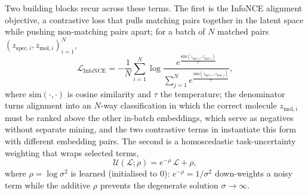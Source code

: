 Two building blocks recur across these terms.
The first is the InfoNCE alignment objective, a contrastive loss that pulls matching pairs together in the latent space while pushing non-matching pairs apart; for a batch of $N$ matched pairs $(z_{\mathrm{spec},i}, z_{\mathrm{mol},i})_{i=1}^{N}$,
\begin{equation}
    \label{eq:infonce}
    \mathcal{L}_{\mathrm{InfoNCE}} = -\frac{1}{N}\sum_{i=1}^{N} \log \frac{e^{\frac{\mathrm{sim}(z_{\mathrm{spec},i}, z_{\mathrm{mol},i})}{\tau}}}{\sum_{j=1}^{N} e^{\frac{\mathrm{sim}(z_{\mathrm{spec},i}, z_{\mathrm{mol},j})}{\tau}}},
\end{equation}
where $\mathrm{sim}(\cdot,\cdot)$ is cosine similarity and $\tau$ the temperature; the denominator turns alignment into an $N$-way classification in which the correct molecule $z_{\mathrm{mol},i}$ must be ranked above the other in-batch embeddings, which serve as negatives without separate mining, and the two contrastive terms in  instantiate this form with different embedding pairs.
The second is a homoscedastic task-uncertainty weighting that wraps selected terms,
\begin{equation}
    \label{eq:uncertainty-wrapper}
    \mathcal{U}(\mathcal{L};\rho) = e^{-\rho}\,\mathcal{L} + \rho,
\end{equation}
where $\rho = \log\sigma^2$ is learned (initialised to $0$): $e^{-\rho}=1/\sigma^2$ down-weights a noisy term while the additive $\rho$ prevents the degenerate solution $\sigma\!\to\!\infty$.

